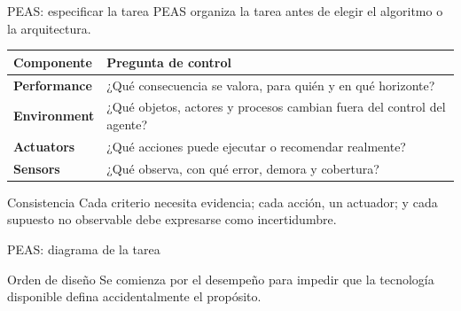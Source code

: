 \documentclass[aspectratio=169,11pt]{beamer}
\begin{document}
\begin{frame}{PEAS: especificar la tarea}
  PEAS organiza la tarea antes de elegir el algoritmo o la arquitectura.
  \small
  \begin{tabularx}{\textwidth}{>{\bfseries}p{} X}
    \toprule
    Componente & Pregunta de control \\
    \midrule
    Performance & ¿Qué consecuencia se valora, para quién y en qué horizonte? \\
    Environment & ¿Qué objetos, actores y procesos cambian fuera del control del agente? \\
    Actuators & ¿Qué acciones puede ejecutar o recomendar realmente? \\
    Sensors & ¿Qué observa, con qué error, demora y cobertura? \\
    \bottomrule
  \end{tabularx}
  \vfill
  \begin{block}{Consistencia}
    Cada criterio necesita evidencia; cada acción, un actuador; y cada supuesto no observable debe expresarse como incertidumbre.
  \end{block}
\end{frame}

\begin{frame}{PEAS: diagrama de la tarea}
  \centering
  \vfill
  \begin{block}{Orden de diseño}
    Se comienza por el desempeño para impedir que la tecnología disponible defina accidentalmente el propósito.
  \end{block}
\end{frame}
\end{document}

